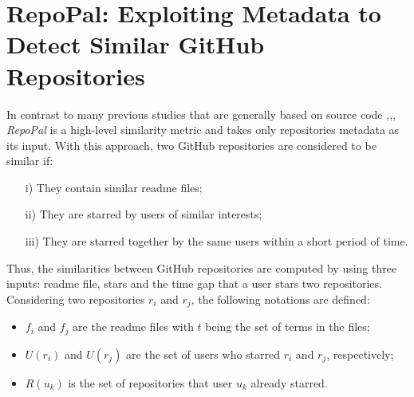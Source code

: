 



\section{RepoPal: Exploiting Metadata to Detect Similar GitHub Repositories}\label{sec:repopal}

In contrast to many previous studies that are generally based on source code \cite{10.1109/APSEC.2004.69},\cite{Liu:2006:GDS:1150402.1150522},\cite{McMillan:2012:DSS:2337223.2337267}, \textit{RepoPal}  \cite{10.1109/SANER.2017.7884605} is a high-level similarity metric and takes only repositories metadata as its input. With this approach, two GitHub repositories are considered to be similar if:

\begin{itemize}
	\item[i)] They contain similar readme files;
	\item[ii)] They are starred by users of similar interests;
	\item[iii)] They are starred together by the same users within a short period of time. 
\end{itemize}

Thus, the similarities between GitHub repositories are computed by using three inputs: readme file, stars and the time gap that a user stars two repositories. Considering two repositories $ r_{i} $ and $ r_{j} $, the following notations are defined: 

\begin{itemize}
	\item $ f_{i} $ and $ f_{j} $ are the readme files with $ t $ being the set of terms in the files; 
	\item $ U(r_{i}) $ and $ U(r_{j}) $ are the set of users who starred $ r_{i} $ and $ r_{j} $, respectively; 
	\item $ R(u_{k}) $ is the set of repositories that user $ u_{k} $ already starred.  
\end{itemize}

